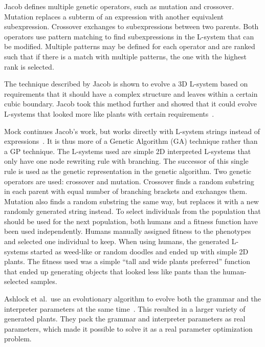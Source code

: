 Jacob defines multiple genetic operators, such as mutation and crossover.
Mutation replaces a subterm of an expression with another equivalent subexpression.
Crossover exchanges to subexpressions between two parents.
Both operators use pattern matching to find subexpressions in the L-system that can be modified.
Multiple patterns may be defined for each operator and are ranked such that if there is a match with multiple patterns, the one with the highest rank is selected.

The technique described by Jacob is shown to evolve a 3D L-system based on requirements that it should have a complex structure and leaves within a certain cubic boundary.
Jacob took this method further and showed that it could evolve L-systems that looked more like plants with certain requirements~\cite{Jacob1995,Jacob1996,Jacob1996-2}.

Mock continues Jacob's work, but works directly with L-system strings instead of expressions~\cite{Mock1998}.
It is thus more of a Genetic Algorithm (GA) technique rather than a GP technique.
The L-systems used are simple 2D interpreted L-systems that only have one node rewriting rule with branching.
The successor of this single rule is used as the genetic representation in the genetic algorithm.
Two genetic operators are used: crossover and mutation.
Crossover finds a random substring in each parent with equal number of branching brackets and exchanges them.
Mutation also finds a random substring the same way, but replaces it with a new randomly generated string instead.
To select individuals from the population that should be used for the next population, both humans and a fitness function have been used independently.
Humans manually assigned fitness to the phenotypes and selected one individual to keep.
When using humans, the generated L-systems started as weed-like or random doodles and ended up with simple 2D plants.
The fitness used was a simple ``tall and wide plants preferred'' function that ended up generating objects that looked less like pants than the human-selected samples.

Ashlock et al.\ use an evolutionary algorithm to evolve both the grammar and the interpreter parameters at the same time~\cite{Ashlock2006}.
This resulted in a larger variety of generated plants.
They pack the grammar and interpreter parameters as real parameters, which made it possible to solve it as a real parameter optimization problem.

